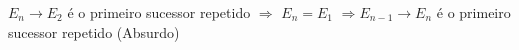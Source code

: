 \documentclass[preview]{standalone}
\begin{document}
\begin{center}
$E_n \rightarrow E_2$ é o primeiro sucessor repetido $\Rightarrow$ $E_n = E_1$
\n      $\Rightarrow E_{n-1} \rightarrow E_n$ é o primeiro sucessor repetido (Absurdo)
\end{center}
\end{document}
